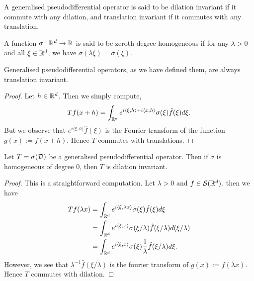 \documentclass{unswmaths}
\begin{document}
\begin{definition}
    A generalised pseudodifferential operator is said to be dilation invariant
    if it commute with any dilation, and translation invariant if it 
    commutes with any translation.
\end{definition}

\begin{definition}
    A function $\sigma:\mathbb{R}^d\to\mathbb{R}$ is said to be zeroth
    degree homogeneous if for any $\lambda > 0$ and all $\xi \in \mathbb{R}^d$,
    we have $\sigma(\lambda \xi) = \sigma(\xi)$. 
\end{definition}



\begin{theorem}
    Generalised pseudodifferential operators, as we have defined them, are always translation
    invariant.
\end{theorem}
\begin{proof}
    Let $h \in \mathbb{R}^d$. Then we simply compute,
    \begin{equation}
        Tf(x+h) = \int_{\mathbb{R}^d} e^{i\langle \xi,h\rangle + i\langle x,h\rangle} \sigma(\xi) \hat{f}(\xi)d\xi.
    \end{equation}
    But we observe that $e^{i\langle \xi,h\rangle}\hat{f}(\xi)$ is the Fourier
    transform of the function $g(x) := f(x+h)$. Hence $T$ commutes with translations.
\end{proof}


\begin{theorem}
    Let $T = \sigma(\mathcal{D})$ be a generalised pseudodifferential operator. Then
    if $\sigma$ is homogeneous of degree $0$, then $T$ is dilation invariant.
\end{theorem}
\begin{proof}
    This is a straightforward computation. Let $\lambda > 0$ and $f \in \mathcal{S}(\mathbb{R}^d)$, then we have
    \begin{align}
        Tf(\lambda x) &= \int_{\mathbb{R}^d} e^{i\langle \xi,\lambda x\rangle} \sigma(\xi) \hat{f}(\xi)d\xi\\
                      &= \int_{\mathbb{R}^d} e^{i \langle \xi,x\rangle} \sigma(\xi/\lambda) \hat{f}(\xi/\lambda)d(\xi/\lambda)\\
                      &= \int_{\mathbb{R}^d} e^{i\langle \xi,x\rangle} \sigma(\xi) \frac{1}{\lambda}\hat{f}(\xi/\lambda)d\xi.
    \end{align}
    However, we see that $\lambda^{-1} \hat{f}(\xi/\lambda)$ is the fourier
    transform of $g(x) := f(\lambda x)$. Hence $T$ commutes with dilation.
\end{proof} 
\end{document}
